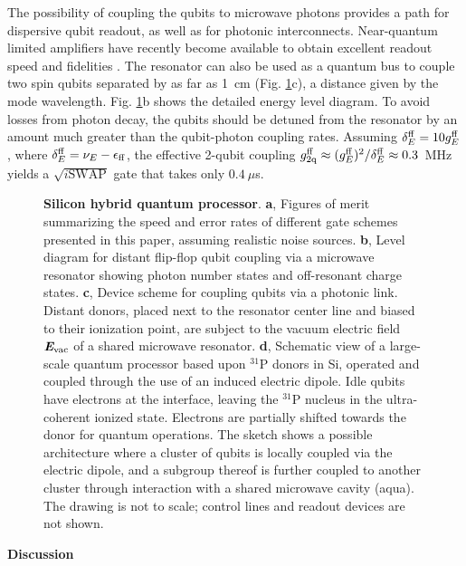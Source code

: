 \documentclass[aps,prb,superscriptaddress,nobibnotes,twocolumn]{revtex4-1}
\begin{document}
The possibility of coupling the qubits to microwave photons provides a path for dispersive qubit readout, as well as for photonic interconnects. Near-quantum limited amplifiers have recently become available to obtain excellent readout speed and fidelities \cite{Castellanos2008}. The resonator can also be used as a quantum bus to couple two spin qubits separated by as far as 1~cm (Fig. \ref{fig:processor}c), a distance given by the mode wavelength. Fig. \ref{fig:processor}b shows the detailed energy level diagram. To avoid losses from photon decay, the qubits should be detuned from the resonator by an amount much greater than the qubit-photon coupling rates. Assuming $\delta^{\rm ff}_E=10g_{E}^{\rm ff}$, where $\delta^{\rm ff}_E=\nu_E-\epsilon_{\rm ff}$, the effective 2-qubit coupling $g_{\rm 2q}^{\rm ff}\approx(g_E^{\rm ff})^2/\delta^{\rm ff}_E\approx 0.3$~MHz yields a $\sqrt{i\mathrm{SWAP}}$ gate that takes only $0.4~\mu$s.


\begin{figure*}
	\centering
	\caption{\textbf{Silicon hybrid quantum processor}.
		\textbf{a}, Figures of merit summarizing the speed and error rates of different gate schemes presented in this paper, assuming realistic noise sources. 
		\textbf{b}, Level diagram for distant flip-flop qubit coupling via a microwave resonator showing photon number states and off-resonant charge states. 
		\textbf{c}, Device scheme for coupling qubits via a photonic link. Distant donors, placed next to the resonator center line and biased to their ionization point, are subject to the vacuum electric field $\textit{\textbf{E}}_{\rm vac}$ of a shared microwave resonator.
		\textbf{d}, Schematic view of a large-scale quantum processor based upon $^{31}$P donors in Si, operated and coupled through the use of an induced electric dipole. Idle qubits have electrons at the interface, leaving the $^{31}$P nucleus in the ultra-coherent ionized state.  Electrons are partially shifted towards the donor for quantum operations. The sketch shows a possible architecture where a cluster of qubits is locally coupled via the electric dipole, and a subgroup thereof is further coupled to another cluster through interaction with a shared microwave cavity (aqua). The drawing is not to scale; control lines and readout devices are not shown.}
	\label{fig:processor}
\end{figure*}


\vspace{3mm}
\noindent\textbf{Discussion}
\end{document}
